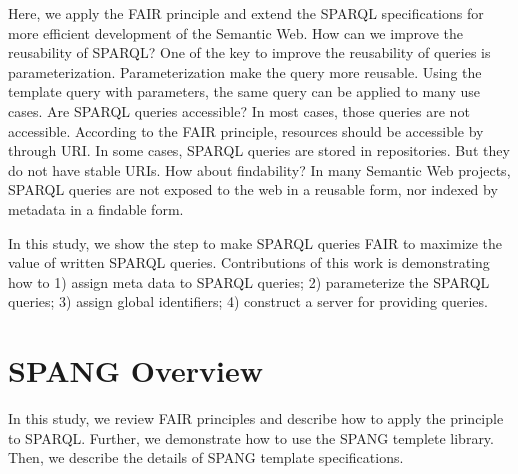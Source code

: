 \documentclass[runningheads]{llncs}
\begin{document}

Here, we apply the FAIR principle and extend the SPARQL specifications for more efficient development of the Semantic Web.
How can we improve the reusability of SPARQL?
One of the key to improve the reusability of queries is parameterization.
Parameterization make the query more reusable.
Using the template query with parameters, the same query can be applied to many use cases.
Are SPARQL queries accessible? In most cases, those queries are not accessible. According to the FAIR principle, resources should be accessible by through URI. In some cases, SPARQL queries are stored in repositories. But they do not have stable URIs. How about findability? 
In many Semantic Web projects, 
SPARQL queries are not exposed to the web in a reusable form, nor indexed by metadata in a findable form.

In this study, we show the step to make SPARQL queries FAIR to maximize the value of written SPARQL queries.
Contributions of this work is demonstrating how to
1) assign meta data to SPARQL queries;
2) parameterize the SPARQL queries;
3) assign global identifiers;
4) construct a server for providing queries.




\section{SPANG Overview}

In this study, we review FAIR principles and describe how to apply the principle to SPARQL.
Further, we demonstrate how to use the SPANG templete library.
Then, we describe the details of SPANG template specifications.
\end{document}
